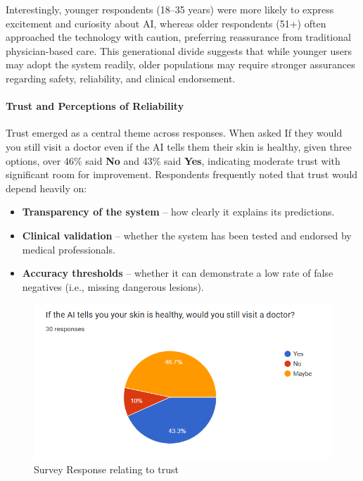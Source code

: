 \documentclass[
  12pt,
  oneside]{article}
\providecommand{\tightlist}{%
  \setlength{\itemsep}{0pt}\setlength{\parskip}{0pt}}
\begin{document}
Interestingly, younger respondents (18--35 years) were more likely to
express excitement and curiosity about AI, whereas older respondents
(51+) often approached the technology with caution, preferring
reassurance from traditional physician-based care. This generational
divide suggests that while younger users may adopt the system readily,
older populations may require stronger assurances regarding safety,
reliability, and clinical endorsement.

\newpage

\paragraph{Trust and Perceptions of
Reliability}\label{trust-and-perceptions-of-reliability}

Trust emerged as a central theme across responses. When asked If they
would you still visit a doctor even if the AI tells them their skin is
healthy, given three options, over 46\% said \textbf{No} and 43\% said
\textbf{Yes}, indicating moderate trust with significant room for
improvement. Respondents frequently noted that trust would depend
heavily on:

\begin{itemize}
\tightlist
\item
  \textbf{Transparency of the system} -- how clearly it explains its
  predictions.\\
\item
  \textbf{Clinical validation} -- whether the system has been tested and
  endorsed by medical professionals.\\
\item
  \textbf{Accuracy thresholds} -- whether it can demonstrate a low rate
  of false negatives (i.e., missing dangerous lesions).
\end{itemize}

\begin{figure}

{\centering \includegraphics[width=1\linewidth]{trust} 

}

\caption{Survey Response relating to trust}\label{fig:unnamed-chunk-8}
\end{figure}
\end{document}

